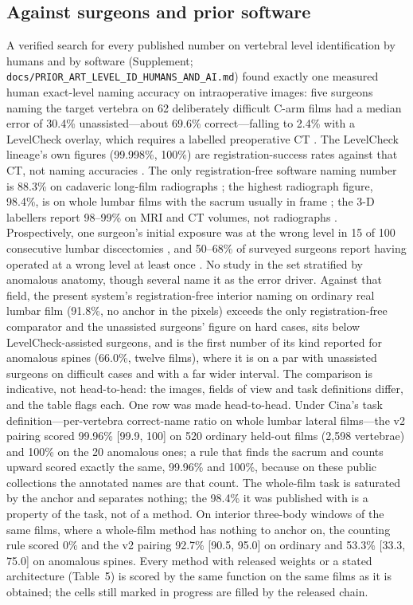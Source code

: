 \documentclass[11pt,letterpaper]{article}
\newcommand{\ci}[2]{[#1, #2]}
\begin{document}
\subsection*{Against surgeons and prior software}
A verified search for every published number on vertebral level identification by humans and by software (Supplement; \texttt{docs/PRIOR\_ART\_LEVEL\_ID\_HUMANS\_AND\_AI.md}) found exactly one measured human exact-level naming accuracy on intraoperative images: five surgeons naming the target vertebra on 62 deliberately difficult C-arm films had a median error of 30.4\% unassisted---about 69.6\% correct---falling to 2.4\% with a LevelCheck overlay, which requires a labelled preoperative CT \citep{manbachi2018}. The LevelCheck lineage's own figures (99.998\%, 100\%) are registration-success rates against that CT, not naming accuracies \citep{levelcheck2012,otake2015}. The only registration-free software naming number is 88.3\% on cadaveric long-film radiographs \citep{huang2022}; the highest radiograph figure, 98.4\%, is on whole lumbar films with the sacrum usually in frame \citep{cina2021}; the 3-D labellers report 98--99\% on MRI and CT volumes, not radiographs \citep{veridah2026}. Prospectively, one surgeon's initial exposure was at the wrong level in 15 of 100 consecutive lumbar discectomies \citep{ammerman2006}, and 50--68\% of surveyed surgeons report having operated at a wrong level at least once \citep{mody2008,mayer2008}. No study in the set stratified by anomalous anatomy, though several name it as the error driver. Against that field, the present system's registration-free interior naming on ordinary real lumbar film (91.8\%, no anchor in the pixels) exceeds the only registration-free comparator and the unassisted surgeons' figure on hard cases, sits below LevelCheck-assisted surgeons, and is the first number of its kind reported for anomalous spines (66.0\%, twelve films), where it is on a par with unassisted surgeons on difficult cases and with a far wider interval. The comparison is indicative, not head-to-head: the images, fields of view and task definitions differ, and the table flags each. One row was made head-to-head. Under Cina's task definition---per-vertebra correct-name ratio on whole lumbar lateral films---the v2 pairing scored 99.96\% \ci{99.9}{100} on 520 ordinary held-out films (2,598 vertebrae) and 100\% on the 20 anomalous ones; a rule that finds the sacrum and counts upward scored exactly the same, 99.96\% and 100\%, because on these public collections the annotated names are that count. The whole-film task is saturated by the anchor and separates nothing; the 98.4\% it was published with is a property of the task, not of a method. On interior three-body windows of the same films, where a whole-film method has nothing to anchor on, the counting rule scored 0\% and the v2 pairing 92.7\% \ci{90.5}{95.0} on ordinary and 53.3\% \ci{33.3}{75.0} on anomalous spines. Every method with released weights or a stated architecture (Table~5) is scored by the same function on the same films as it is obtained; the cells still marked in progress are filled by the released chain.
\end{document}
